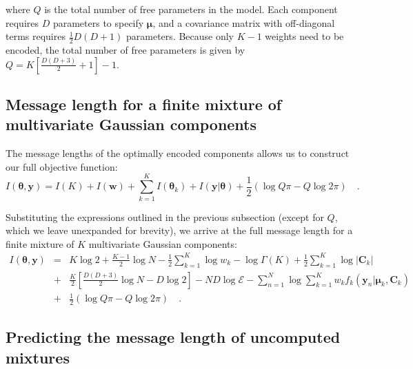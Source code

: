 \documentclass{article}
\newcommand{\vect}[1]{\boldsymbol{\mathbf{#1}}}
\def\veccov{\vect{C}}
\def\vecmean{\vect{\mu}}
\def\vectheta{\vect{\theta}}
\def\weight{w}
\def\weights{\vect{\weight}}
\def\datum{y}
\def\data{\vect{\datum}}
\begin{document}
\noindent{}where $Q$ is the total number of free parameters in the model. Each
component requires $D$ parameters to specify $\vecmean$, and a covariance
matrix with off-diagonal terms requires $\frac{1}{2}D(D+1)$ parameters.
Because only $K - 1$ weights need to be encoded, the total number of free
parameters is given by ${Q = K\left[\frac{D(D+3)}{2} + 1\right] - 1}$.


\subsection{Message length for a finite mixture of multivariate Gaussian components}

The message lengths of the optimally encoded components allows us to construct
our full objective function:
\begin{equation}
  I(\vectheta,\data) = I(K) + I(\weights) + \sum_{k=1}^{K}I(\vectheta_k) + I(\data|\vectheta) + \frac{1}{2}\left(\log{Q\pi} - Q\log{2\pi}\right)\quad .
\end{equation}

\noindent{}Substituting the expressions outlined in the previous subsection
(except for $Q$, which we leave unexpanded for brevity), we arrive at the full
message length for a finite mixture of $K$ multivariate Gaussian components:
\begin{eqnarray}
  I(\vectheta,\data) &=&
      K\log{2} %
    + \frac{K - 1}{2}\log{N} - \frac{1}{2}\sum_{k=1}^{K}\log\weight_k - \log{\Gamma(K)} %
    + \frac{1}{2}\sum_{k=1}^{K}\log{|\veccov_k|} \nonumber \\ %
   &+&\frac{K}{2}\left[\frac{D(D+3)}{2}\log{N} - D\log{2}\right] %
    - ND\log\mathcal{E} - \sum_{n=1}^{N}\log\sum_{k=1}^{K}w_{k}f_k(\data_n|\vecmean_k,\veccov_k) \nonumber \\ %
   &+& \frac{1}{2}\left(\log{Q\pi} - Q\log{2\pi}\right) \quad . %
    \label{eq:objective-function}
\end{eqnarray}


\subsection{Predicting the message length of uncomputed mixtures}
\end{document}
